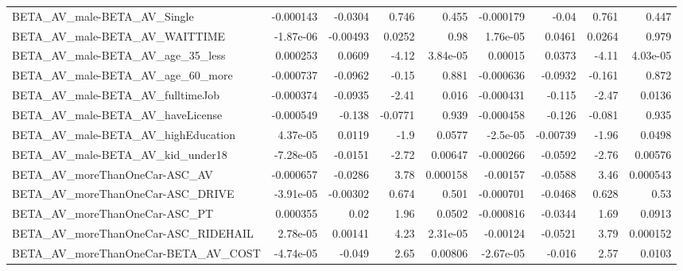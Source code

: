 \begin{tabular}{lrrrrrrrr}
BETA\_AV\_male-BETA\_AV\_Single                        &   -0.000143 &      -0.0304 &     0.746 &    0.455 &  -0.000179 &       -0.04 &        0.761 &         0.447 \\
BETA\_AV\_male-BETA\_AV\_WAITTIME                      &   -1.87e-06 &     -0.00493 &    0.0252 &     0.98 &   1.76e-05 &      0.0461 &       0.0264 &         0.979 \\
BETA\_AV\_male-BETA\_AV\_age\_35\_less                   &    0.000253 &       0.0609 &     -4.12 & 3.84e-05 &    0.00015 &      0.0373 &        -4.11 &      4.03e-05 \\
BETA\_AV\_male-BETA\_AV\_age\_60\_more                   &   -0.000737 &      -0.0962 &     -0.15 &    0.881 &  -0.000636 &     -0.0932 &       -0.161 &         0.872 \\
BETA\_AV\_male-BETA\_AV\_fulltimeJob                   &   -0.000374 &      -0.0935 &     -2.41 &    0.016 &  -0.000431 &      -0.115 &        -2.47 &        0.0136 \\
BETA\_AV\_male-BETA\_AV\_haveLicense                   &   -0.000549 &       -0.138 &   -0.0771 &    0.939 &  -0.000458 &      -0.126 &       -0.081 &         0.935 \\
BETA\_AV\_male-BETA\_AV\_highEducation                 &    4.37e-05 &       0.0119 &      -1.9 &   0.0577 &   -2.5e-05 &    -0.00739 &        -1.96 &        0.0498 \\
BETA\_AV\_male-BETA\_AV\_kid\_under18                   &   -7.28e-05 &      -0.0151 &     -2.72 &  0.00647 &  -0.000266 &     -0.0592 &        -2.76 &       0.00576 \\
BETA\_AV\_moreThanOneCar-ASC\_AV                      &   -0.000657 &      -0.0286 &      3.78 & 0.000158 &   -0.00157 &     -0.0588 &         3.46 &      0.000543 \\
BETA\_AV\_moreThanOneCar-ASC\_DRIVE                   &   -3.91e-05 &     -0.00302 &     0.674 &    0.501 &  -0.000701 &     -0.0468 &        0.628 &          0.53 \\
BETA\_AV\_moreThanOneCar-ASC\_PT                      &    0.000355 &         0.02 &      1.96 &   0.0502 &  -0.000816 &     -0.0344 &         1.69 &        0.0913 \\
BETA\_AV\_moreThanOneCar-ASC\_RIDEHAIL                &    2.78e-05 &      0.00141 &      4.23 & 2.31e-05 &   -0.00124 &     -0.0521 &         3.79 &      0.000152 \\
BETA\_AV\_moreThanOneCar-BETA\_AV\_COST                &   -4.74e-05 &       -0.049 &      2.65 &  0.00806 &  -2.67e-05 &      -0.016 &         2.57 &        0.0103 \\

\end{tabular}
